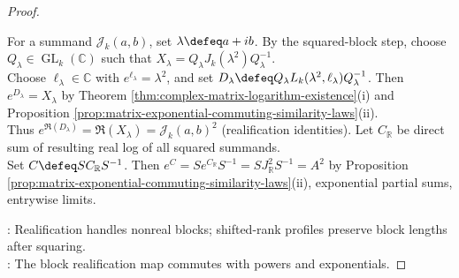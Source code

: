 \begin{proposition}
\begin{proof}
\begin{enumerate}[label=(\roman*)]
For a summand $\mathcal{J}_k(a,b)$, set $\lambda\defeq a+ib$. By the squared-block step, choose $Q_{\lambda}\in\operatorname{GL}_k(\mathbb{C})$ such that $X_{\lambda}=Q_{\lambda}J_k(\lambda^2)Q_{\lambda}^{-1}$.\\
Choose $\ell_{\lambda}\in\mathbb{C}$ with $e^{\ell_{\lambda}}=\lambda^2$, and set $D_{\lambda}\defeq Q_{\lambda}L_k(\lambda^2,\ell_{\lambda})Q_{\lambda}^{-1}$. Then $e^{D_{\lambda}}=X_{\lambda}$ by Theorem \ref{thm:complex-matrix-logarithm-existence}(i) and Proposition \ref{prop:matrix-exponential-commuting-similarity-laws}(ii).\\
Thus $e^{\mathfrak{R}(D_{\lambda})}=\mathfrak{R}(X_{\lambda})=\mathcal{J}_k(a,b)^2$ (realification identities). Let $C_{\mathbb{R}}$ be direct sum of resulting real log of all squared summands.\\
Set $C\defeq SC_{\mathbb{R}}S^{-1}$. Then $e^C=S e^{C_{\mathbb{R}}}S^{-1}=SJ_{\mathbb{R}}^2S^{-1}=A^2$ by Proposition \ref{prop:matrix-exponential-commuting-similarity-laws}(ii), exponential partial sums, entrywise limits.
\end{enumerate}
: Realification handles nonreal blocks; shifted-rank profiles preserve block lengths after squaring.\\
: The block realification map commutes with powers and exponentials.
\end{proof}
\end{proposition}

